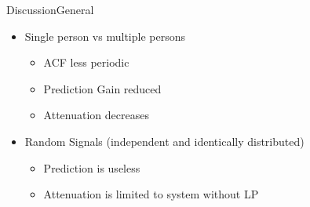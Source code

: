 

	













\begin{frame}{Discussion}{General}		
\begin{itemize}
	\item Single person vs multiple persons
	\begin{itemize}
		\item ACF less periodic
		\item Prediction Gain reduced
		\item Attenuation decreases
	\end{itemize}
	\item Random Signals (independent and identically distributed)
	\begin{itemize}
		\item Prediction is useless
		\item Attenuation is limited to system without LP
	\end{itemize}
\end{itemize}
\end{frame}


